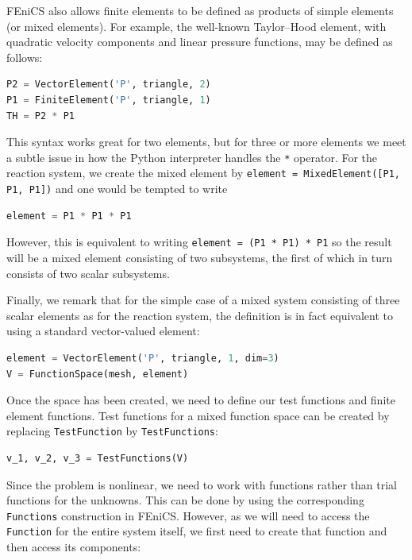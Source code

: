 \documentclass[graybox,envcountchap,sectrefs,final]{svmonodo}
\newenvironment{warning_mdfboxadmon}[1][]{
\begin{warning_mdfboxmdframed}[frametitle=#1]
}
{
\end{warning_mdfboxmdframed}
}
\begin{document}
\begin{warning_mdfboxadmon}
FEniCS also allows finite elements to be defined as products of simple
elements (or mixed elements). For example, the well-known Taylor--Hood
element, with quadratic velocity components and linear pressure functions,
may be defined as follows:

\begin{lstlisting}[language=Python,style=graycolor]
P2 = VectorElement('P', triangle, 2)
P1 = FiniteElement('P', triangle, 1)
TH = P2 * P1
\end{lstlisting}
This syntax works great for two elements, but for three or more
elements we meet a subtle issue in how the Python interpreter handles
the \texttt{*} operator. For the reaction system, we create the mixed element
by \texttt{element = MixedElement([P1, P1, P1])} and one would be tempted to
write

\begin{lstlisting}[language=Python,style=graycolor]
element = P1 * P1 * P1
\end{lstlisting}
However, this is equivalent to writing \texttt{element = (P1 * P1) * P1} so
the result will be a mixed element consisting of two subsystems, the
first of which in turn consists of two scalar subsystems.

Finally, we remark that for the simple case of a mixed system
consisting of three scalar elements as for the reaction system, the
definition is in fact equivalent to using a standard vector-valued
element:


\begin{lstlisting}[language=Python,style=graycolor]
element = VectorElement('P', triangle, 1, dim=3)
V = FunctionSpace(mesh, element)
\end{lstlisting}
\end{warning_mdfboxadmon} %


Once the space has been created, we need to define our test functions
and finite element functions. Test functions for a mixed function
space can be created by replacing \texttt{TestFunction} by \texttt{TestFunctions}:

\begin{lstlisting}[language=Python,style=graycolor]
v_1, v_2, v_3 = TestFunctions(V)
\end{lstlisting}

Since the problem is nonlinear, we need to work with functions rather
than trial functions for the unknowns. This can be done by using the
corresponding \texttt{Functions} construction in FEniCS. However, as we will
need to access the \texttt{Function} for the entire system itself, we first
need to create that function and then access its components:
\end{document}
